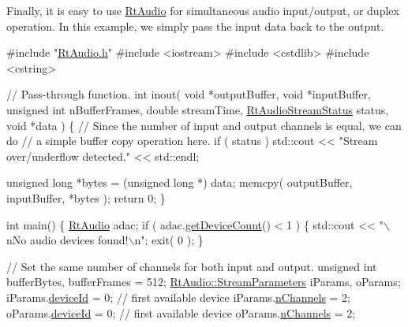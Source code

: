 Finally, it is easy to use \hyperlink{class_rt_audio}{Rt\+Audio} for simultaneous audio input/output, or duplex operation. In this example, we simply pass the input data back to the output.


\begin{DoxyCode}
\textcolor{preprocessor}{#include "\hyperlink{_rt_audio_8h}{RtAudio.h}"}
\textcolor{preprocessor}{#include <iostream>}
\textcolor{preprocessor}{#include <cstdlib>}
\textcolor{preprocessor}{#include <cstring>}

\textcolor{comment}{// Pass-through function.}
\textcolor{keywordtype}{int} inout( \textcolor{keywordtype}{void} *outputBuffer, \textcolor{keywordtype}{void} *inputBuffer, \textcolor{keywordtype}{unsigned} \textcolor{keywordtype}{int} nBufferFrames,
           \textcolor{keywordtype}{double} streamTime, \hyperlink{_rt_audio_8h_a80e306d363583da3b0a1b65d9b57c806}{RtAudioStreamStatus} status, \textcolor{keywordtype}{void} *data )
\{
  \textcolor{comment}{// Since the number of input and output channels is equal, we can do}
  \textcolor{comment}{// a simple buffer copy operation here.}
  \textcolor{keywordflow}{if} ( status ) std::cout << \textcolor{stringliteral}{"Stream over/underflow detected."} << std::endl;

  \textcolor{keywordtype}{unsigned} \textcolor{keywordtype}{long} *bytes = (\textcolor{keywordtype}{unsigned} \textcolor{keywordtype}{long} *) data;
  memcpy( outputBuffer, inputBuffer, *bytes );
  \textcolor{keywordflow}{return} 0;
\}

\textcolor{keywordtype}{int} main()
\{
 \hyperlink{class_rt_audio}{RtAudio} adac;
  \textcolor{keywordflow}{if} ( adac.\hyperlink{class_rt_audio_a747ce2d73803641bbb66d6e78092aa1a}{getDeviceCount}() < 1 ) \{
    std::cout << \textcolor{stringliteral}{"\(\backslash\)nNo audio devices found!\(\backslash\)n"};
    exit( 0 );
  \}

  \textcolor{comment}{// Set the same number of channels for both input and output.}
  \textcolor{keywordtype}{unsigned} \textcolor{keywordtype}{int} bufferBytes, bufferFrames = 512;
  \hyperlink{struct_rt_audio_1_1_stream_parameters}{RtAudio::StreamParameters} iParams, oParams;
  iParams.\hyperlink{struct_rt_audio_1_1_stream_parameters_ab3c72bcf3ef12149ae9a4fb597cc5489}{deviceId} = 0; \textcolor{comment}{// first available device}
  iParams.\hyperlink{struct_rt_audio_1_1_stream_parameters_a88a10091b6e284e21235cc6f25332ebd}{nChannels} = 2;
  oParams.\hyperlink{struct_rt_audio_1_1_stream_parameters_ab3c72bcf3ef12149ae9a4fb597cc5489}{deviceId} = 0; \textcolor{comment}{// first available device}
  oParams.\hyperlink{struct_rt_audio_1_1_stream_parameters_a88a10091b6e284e21235cc6f25332ebd}{nChannels} = 2;


\end{DoxyCode}
